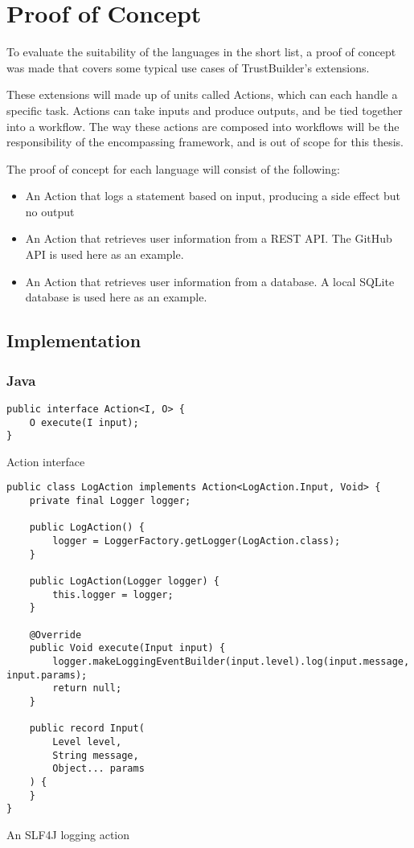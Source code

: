 \chapter{Proof of Concept}
\label{ch:proof-of-concept}
To evaluate the suitability of the languages in the short list, a proof of concept was made that covers some typical use cases of TrustBuilder's extensions. 

These extensions will made up of units called Actions, which can each handle a specific task. Actions can take inputs and produce outputs, and be tied together into a workflow. The way these actions are composed into workflows will be the responsibility of the encompassing framework, and is out of scope for this thesis.

The proof of concept for each language will consist of the following:
\begin{itemize}
    \item An Action that logs a statement based on input, producing a side effect but no output
    \item An Action that retrieves user information from a REST API. The GitHub API is used here as an example.
    \item An Action that retrieves user information from a database. A local SQLite database is used here as an example.
\end{itemize}

\section{Implementation}
\subsection{Java}

\begin{listing}[H]
\begin{verbatim}
public interface Action<I, O> {
    O execute(I input);
}
\end{verbatim}
\caption{Action interface}
\end{listing}

\begin{listing}[H]
\begin{verbatim}
public class LogAction implements Action<LogAction.Input, Void> {
    private final Logger logger;
    
    public LogAction() {
        logger = LoggerFactory.getLogger(LogAction.class);
    }
    
    public LogAction(Logger logger) {
        this.logger = logger;
    }
    
    @Override
    public Void execute(Input input) {
        logger.makeLoggingEventBuilder(input.level).log(input.message, input.params);
        return null;
    }
    
    public record Input(
        Level level,
        String message,
        Object... params
    ) {
    }
}
\end{verbatim}
\caption{An SLF4J logging action}
\end{listing}


